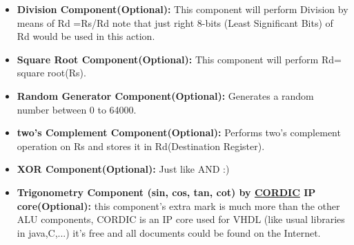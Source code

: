 \documentclass{report}
\begin{document}
\begin{itemize}
        \item \textbf{Division Component(Optional):}
             This component will perform Division by means of Rd =Rs/Rd note that just right 		8-bits (Least Significant Bits) of Rd would be used in this action.
        \item \textbf{Square Root Component(Optional):}
            This component will perform Rd= square root(Rs).
        \item \textbf{Random Generator Component(Optional):}
            Generates a random number between 0 to 64000.
        \item \textbf{two’s Complement Component(Optional):}
            Performs two's complement operation on Rs and stores it in Rd(Destination Register).
        \item \textbf{XOR Component(Optional):}
            Just like AND :)
        \item \textbf{Trigonometry Component (sin, cos, tan, cot) by \href{https://en.wikipedia.org/wiki/CORDIC}{CORDIC} IP core(Optional):}
            this component’s extra mark is much more than the other ALU components, 			CORDIC is an IP core used for VHDL (like usual libraries in java,C,...) it’s free and all 			documents could be found on the Internet.
    \end{itemize}
\end{document}
